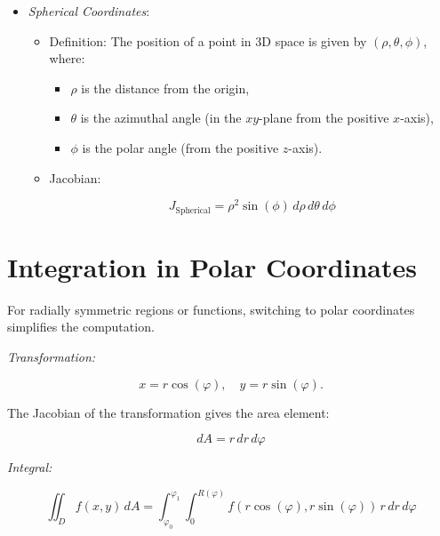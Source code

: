 \begin{itemize}
    \item \emph{Spherical Coordinates}:
    
    \begin{itemize}
        
        \item Definition: The position of a point in 3D space is given by \((\rho, \theta, \phi)\), where:
        
        \begin{itemize}
            
            \item \(\rho\) is the distance from the origin,
            
            \item \(\theta\) is the azimuthal angle (in the \(xy\)-plane from the positive \(x\)-axis),
            
            \item \(\phi\) is the polar angle (from the positive \(z\)-axis).
        
        \end{itemize}
        
        \item Jacobian:
               
              \[
                    J_{\text{Spherical}} = \rho^2 \sin (\phi)\, d\rho\, d\theta\, d\phi
              \]
            
    \end{itemize}

\end{itemize}

\section{Integration in Polar Coordinates}

For radially symmetric regions or functions, switching to polar coordinates simplifies the computation.

\emph{Transformation:}

\[
    x = r \cos(\varphi), \quad y = r \sin (\varphi).
\]

The Jacobian of the transformation gives the area element:

\[
    dA = r\, dr\, d\varphi
\]

\emph{Integral:}

\[
    \iint_D f(x, y)\, dA = \int_{\varphi_0}^{\varphi_1} \int_{0}^{R(\varphi)} f(r \cos(\varphi), r 
    \sin(\varphi))\, r\, dr\, d\varphi
\]


